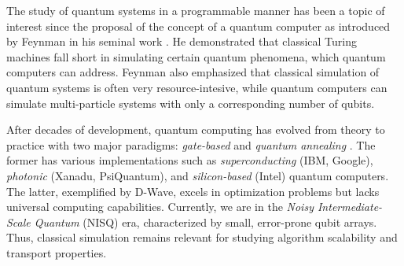 \documentclass[../../main.tex]{subfiles}
\begin{document}

The study of quantum systems in a programmable manner has been a topic of
interest since the proposal of the concept of a quantum computer as introduced
by Feynman in his seminal work \cite{feynman1982}. He demonstrated that
classical Turing machines fall short in simulating certain quantum phenomena,
which quantum computers can address. Feynman also emphasized that classical
simulation of quantum systems is often very resource-intesive, while quantum
computers can simulate multi-particle systems with only a corresponding number
of qubits.


After decades of development, quantum computing has evolved from theory to
practice with two major paradigms: \textit{gate-based} and \textit{quantum
annealing} \cite{willschLecture22}. The former has various implementations such as 
\textit{superconducting} (IBM, Google), \textit{photonic} (Xanadu,
PsiQuantum), and \textit{silicon-based} (Intel) quantum computers. The latter,
exemplified by D-Wave, excels in optimization problems but lacks universal computing
capabilities. Currently, we are in the \textit{Noisy Intermediate-Scale
Quantum} (NISQ) era, characterized by small, error-prone qubit arrays. Thus,
classical simulation remains relevant for studying algorithm scalability and
transport properties.
\end{document}
